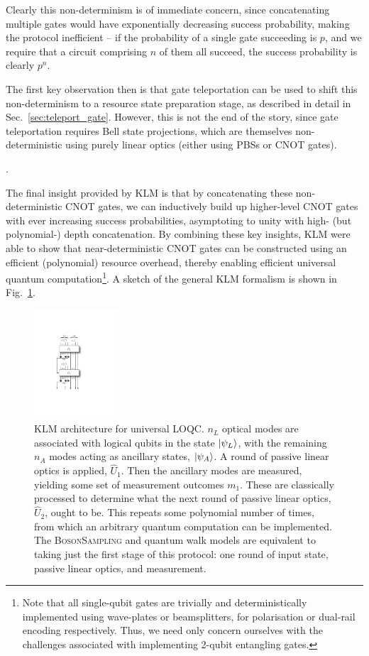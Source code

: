Clearly this non-determinism is of immediate concern, since concatenating multiple gates would have exponentially decreasing success probability, making the protocol inefficient -- if the probability of a single gate succeeding is $p$, and we require that a circuit comprising $n$ of them all succeed, the success probability is clearly $p^n$.

The first key observation then is that gate teleportation can be used to shift this non-determinism to a resource state preparation stage, as described in detail in Sec.~\ref{sec:teleport_gate}. However, this is not the end of the story, since gate teleportation requires Bell state projections, which are themselves non-deterministic using purely linear optics (either using PBSs or CNOT gates).

.

The final insight provided by KLM is that by concatenating these non-deterministic CNOT gates, we can inductively build up higher-level CNOT gates with ever increasing success probabilities, asymptoting to unity with high- (but polynomial-) depth concatenation. By combining these key insights, KLM were able to show that near-deterministic CNOT gates can be constructed using an efficient (polynomial) resource overhead, thereby enabling efficient universal quantum computation\footnote{Note that all single-qubit gates are trivially and deterministically implemented using wave-plates or beamsplitters, for polarisation or dual-rail encoding respectively. Thus, we need only concern ourselves with the challenges associated with implementing 2-qubit entangling gates.}. A sketch of the general KLM formalism is shown in Fig.~\ref{fig:KLM_protocol}.

\begin{figure}[!htbp]
\includegraphics[clip=true, width=0.28\textwidth]{KLM}
\captionspacefig \caption{KLM architecture for universal LOQC. $n_L$ optical modes are associated with logical qubits in the state $|\psi_L\rangle$, with the remaining $n_A$ modes acting as ancillary states, $|\psi_A\rangle$. A round of passive linear optics is applied, $\hat{U}_1$. Then the ancillary modes are measured, yielding some set of measurement outcomes $m_1$. These are classically processed to determine what the next round of passive linear optics, $\hat{U}_2$, ought to be. This repeats some polynomial number of times, from which an arbitrary quantum computation can be implemented. The \textsc{BosonSampling} and quantum walk models are equivalent to taking just the first stage of this protocol: one round of input state, passive linear optics, and measurement.} \label{fig:KLM_protocol}
\end{figure}

